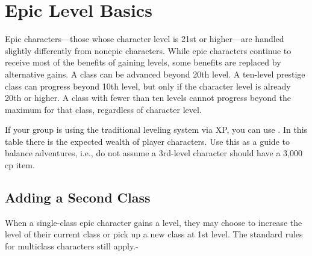 \section{Epic Level Basics}
Epic characters---those whose character level is 21st or higher---are handled slightly differently from nonepic characters. While epic characters continue to receive most of the benefits of gaining levels, some benefits are replaced by alternative gains. A class can be advanced beyond 20th level. A ten-level prestige class can progress beyond 10th level, but only if the character level is already 20th or higher. A class with fewer than ten levels cannot progress beyond the maximum for that class, regardless of character level.

If your group is using the traditional leveling system via XP, you can use . In this table there is the expected wealth of player characters. Use this as a guide to balance adventures, i.e., do not assume a 3rd-level character should have a 3,000 cp item.






\subsection{Adding a Second Class}
When a single-class epic character gains a level, they may choose to increase the level of their current class or pick up a new class at 1st level. The standard rules for multiclass characters still apply.-

